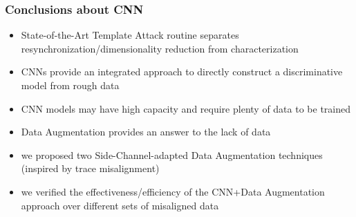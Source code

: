 %



\begin{frame}
\frametitle{Conclusions about CNN}

\begin{block}{}
\begin{itemize}
\item State-of-the-Art Template Attack routine separates resynchronization/dimensionality reduction from characterization \pause
\item CNNs provide an integrated approach to directly construct a discriminative model from rough data \pause
\item CNN models may have high capacity and require plenty of data to be trained \pause 
\item Data Augmentation provides an answer to the lack of data \pause
\item we proposed two Side-Channel-adapted Data Augmentation techniques (inspired by trace misalignment)\pause
\item we verified the effectiveness/efficiency of the CNN+Data Augmentation approach over different sets of misaligned data
\end{itemize}
\end{block}

\end{frame}
